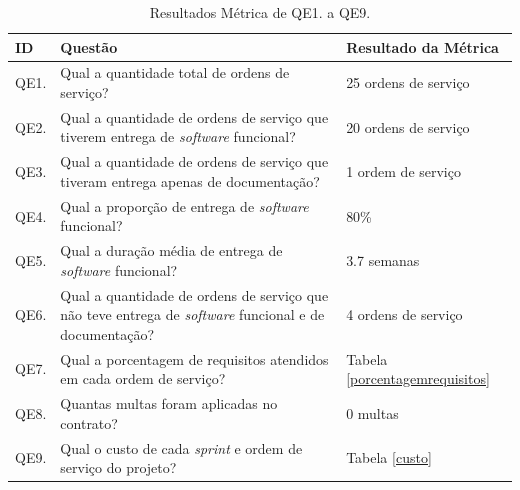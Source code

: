 \begin{table}[h]
\begin{tabular}{|p{2.0cm}|p{9.0cm}|p{5.0cm}|}
\hline
\textbf{ID} & \textbf{Questão}                                                                                                                                  & \textbf{Resultado da Métrica}    \\ \hline
QE1.        & Qual a quantidade total de ordens de serviço?                                                                                                    & 25 ordens de serviço          \\ \hline
QE2.        & Qual a quantidade de ordens de serviço que tiverem entrega de \textit{software} funcional?                                                                & 20 ordens de serviço          \\ \hline
QE3.        & Qual a quantidade de ordens de serviço que tiveram entrega apenas de documentação?                                                               & 1 ordem de serviço            \\ \hline
QE4.        & Qual a proporção de entrega de \textit{software} funcional?                                                                                               & 80\%                          \\ \hline
QE5.        & Qual a duração média de entrega de \textit{software} funcional?                                                                                           & 3.7 semanas                   \\ \hline
QE6.        & Qual a quantidade de ordens de serviço que não teve entrega de \textit{software} funcional e  de documentação?   & 4 ordens de serviço           \\ \hline
QE7.        & Qual a porcentagem de requisitos atendidos em cada ordem de serviço?                                                                             &  Tabela \ref{porcentagemrequisitos} \\ \hline
QE8.        & Quantas multas foram aplicadas no contrato?                                                                                                      & 0 multas                      \\ \hline
QE9.        & Qual o custo de cada \textit{sprint} e ordem de serviço do projeto?                                                                                       & Tabela \ref{custo}                 \\ \hline
\end{tabular}
\caption{Resultados Métrica de QE1. a QE9.}
		\label{resultadosmetricas}
\end{table}


